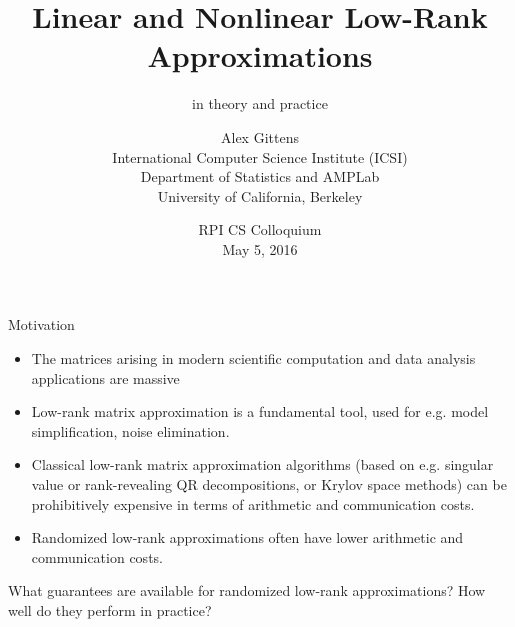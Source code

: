 \documentclass[xcolor=x11names,compress,ignorenonframetext,10pt]{beamer}
\renewcommand{\(}{\begin{columns}}
\renewcommand{\)}{\end{columns}}
\newcommand{\<}[1]{\begin{column}{#1}}
\renewcommand{\>}{\end{column}}
\begin{document}
\begin{frame}
  \title{Linear and Nonlinear Low-Rank Approximations}
  \subtitle{in theory and practice}
\author{
	\begin{tabular}[h]{c}
	Alex Gittens \\
  International Computer Science Institute (ICSI) \\
  Department of Statistics and AMPLab \\
  University of California, Berkeley
	\end{tabular}
}
\date{
  RPI CS Colloquium \\
  May 5, 2016
}
\maketitle
\end{frame}

 \begin{frame}{Motivation}
 \begin{itemize}
   \item The matrices arising in modern scientific computation and data analysis applications are massive
   \item Low-rank matrix approximation is a fundamental tool, used for e.g. model simplification, noise elimination.
   \item Classical low-rank matrix approximation algorithms (based on e.g. singular value or rank-revealing QR decompositions, or
   Krylov space methods) can be prohibitively expensive in terms of arithmetic and communication costs.
   \item Randomized low-rank approximations often have lower arithmetic and communication costs.
 \end{itemize}
 
 \begin{block}{What guarantees are available for randomized low-rank approximations? How well do they perform in practice?}
 \end{block}
 
 \end{frame}
\end{document}
